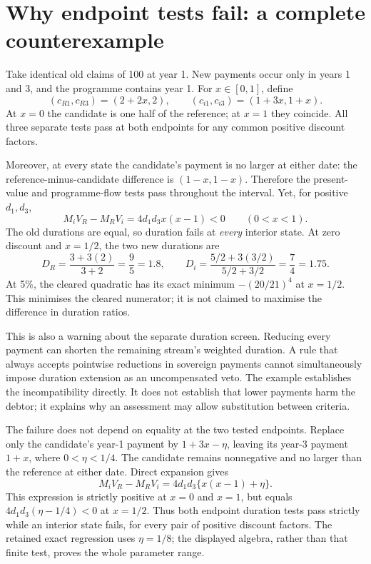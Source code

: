 \documentclass[11pt,a4paper]{article}
\begin{document}
\section{Why endpoint tests fail: a complete counterexample}\label{sec:interior}
Take identical old claims of 100 at year 1. New payments occur only in years 1 and 3, and the programme contains year 1. For $x\in[0,1]$, define
\begin{equation}\label{eq:interiorflows}
 (c_{R1},c_{R3})=(2+2x,2),\qquad
 (c_{i1},c_{i3})=(1+3x,1+x).
\end{equation}
At $x=0$ the candidate is one half of the reference; at $x=1$ they coincide. All three separate tests pass at both endpoints for any common positive discount factors.

Moreover, at every state the candidate's payment is no larger at either date: the reference-minus-candidate difference is $(1-x,1-x)$. Therefore the present-value and programme-flow tests pass throughout the interval. Yet, for positive $d_1,d_3$,
\begin{equation}
 M_iV_R-M_RV_i=4d_1d_3x(x-1)<0\qquad(0<x<1).
\end{equation}
The old durations are equal, so duration fails at \emph{every} interior state. At zero discount and $x=1/2$, the two new durations are
\begin{equation}
 D_R=\frac{3+3(2)}{3+2}=\frac95=1.8,\qquad
 D_i=\frac{5/2+3(3/2)}{5/2+3/2}=\frac74=1.75.
\end{equation}
At 5\%, the cleared quadratic has its exact minimum $- (20/21)^4$ at $x=1/2$. This minimises the cleared numerator; it is not claimed to maximise the difference in duration ratios.

This is also a warning about the separate duration screen. Reducing every payment can shorten the remaining stream's weighted duration. A rule that always accepts pointwise reductions in sovereign payments cannot simultaneously impose duration extension as an uncompensated veto. The example establishes the incompatibility directly. It does not establish that lower payments harm the debtor; it explains why an assessment may allow substitution between criteria.

The failure does not depend on equality at the two tested endpoints. Replace only the candidate's year-1 payment by $1+3x-\eta$, leaving its year-3 payment $1+x$, where $0<\eta<1/4$. The candidate remains nonnegative and no larger than the reference at either date. Direct expansion gives
\begin{equation}\label{eq:strictendpoint}
 M_iV_R-M_RV_i=4d_1d_3\{x(x-1)+\eta\}.
\end{equation}
This expression is strictly positive at $x=0$ and $x=1$, but equals $4d_1d_3(\eta-1/4)<0$ at $x=1/2$. Thus both endpoint duration tests pass strictly while an interior state fails, for every pair of positive discount factors. The retained exact regression uses $\eta=1/8$; the displayed algebra, rather than that finite test, proves the whole parameter range.
\end{document}
